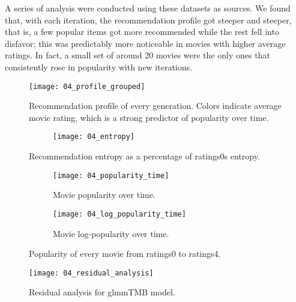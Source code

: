A series of analysis were conducted using these datasets as sources. We found
that, with each iteration, the recommendation profile got steeper and steeper,
that is, a few popular items got more recommended while the rest fell into
disfavor; this was predictably more noticeable in movies with higher average
ratings. In fact, a small set of around 20 movies were the only ones that
consistently rose in popularity with new iterations.

\begin{figure}
  \centering
  \texttt{[image: 04\_profile\_grouped]}
  \caption{Recommendation profile of every generation. Colors indicate average
  movie rating, which is a strong predictor of popularity over time.
  \label{fig:fig04_profile_grouped}}
\end{figure}

\begin{figure}
  \centering
  \begin{subfigure}{0.45\textwidth}
    \centering
    \texttt{[image: 04\_entropy]}
  \end{subfigure}
  \caption{Recommendation entropy as a percentage of ratings0s entropy.
  \label{fig:fig04_entropy}}
\end{figure}

\begin{figure}
  \centering
  \begin{subfigure}{0.45\textwidth}
    \centering
    \texttt{[image: 04\_popularity\_time]}
    \caption{Movie popularity over time.\label{fig:fig04_popularity_time}}
  \end{subfigure}
  \begin{subfigure}{0.45\textwidth}
    \centering
    \texttt{[image: 04\_log\_popularity\_time]}
    \caption{Movie log-popularity over time.\label{fig:fig04_log_popularity_time}}
  \end{subfigure}
  \caption{Popularity of every movie from ratings0 to ratings4.\label{fig:fig04_popularity_time_both}}
\end{figure}


\begin{figure}
  \centering
  \texttt{[image: 04\_residual\_analysis]}
  \caption{Residual analysis for glmmTMB model.\label{fig:fig04_residual_analysis}}
\end{figure}


